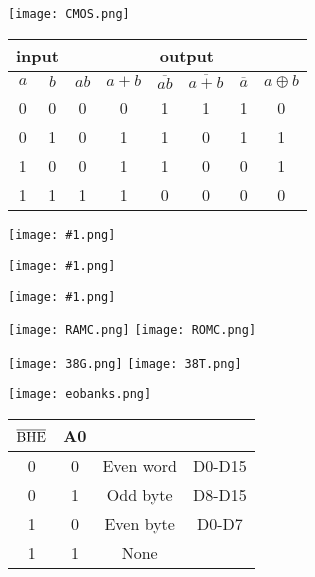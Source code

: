 \documentclass[10pt,a4paper]{article}
\def\img#1#2{\begin{tcolorbox}[title=#2]\texttt{[image: \#1.png]}\end{tcolorbox}}
\begin{document}
\begin{CJK}{UTF8}{song}
\begin{twocolumn}
\begin{tcolorbox}[title=逻辑门电路]
			\centering
			\texttt{[image: CMOS.png]}
			\begin{tabular}{|c|c|c|c|c|c|c|c|}
				\hline
				\multicolumn{2}{|c|}{input} & \multicolumn{6}{c|}{output} \\
				\hline
				$ a $ & $ b $  & $ ab $ & $ a+b $ & $ \overline{ab} $ & $ \overline{a+b} $& $\overline{a}$ & $a\oplus b$ \\
				\hline
				0 & 0 & 0 & 0 & 1 & 1 & 1 & 0 \\
				\hline
				0 & 1 & 0 & 1 & 1 & 0 & 1 & 1 \\
				\hline
				1 & 0 & 0 & 1 & 1 & 0 & 0 & 1 \\
				\hline
				1 & 1 & 1 & 1 & 0 & 0 & 0 & 0 \\
				\hline
			\end{tabular}
		\end{tcolorbox}
		\begin{tcolorbox}[title=锁存器和数据传输器]
			\img{latch}{74LS373 D Latch}
			\img{dt}{Data Bus Transceiver}
		\end{tcolorbox}
		\img{buscycle}{8086/88 总线周期}
		\begin{tcolorbox}[title=RAM\&ROM]
			\centering
				\texttt{[image: RAMC.png]}
				\texttt{[image: ROMC.png]}
		\end{tcolorbox}
		\begin{tcolorbox}[title=74LS138 38译码器]
			\texttt{[image: 38G.png]}
			\texttt{[image: 38T.png]}
		\end{tcolorbox}
		\begin{tcolorbox}[title=8086存储组织]
			\centering
			\texttt{[image: eobanks.png]}
			\begin{tabular}{|c|c|c|c|}
				\hline
				$\rm \overline{BHE}$ & A0 &  &  \\
				\hline
				0 & 0 & Even word & D0-D15 \\
				\hline
				0 & 1 & Odd byte & D8-D15 \\
				\hline
				1 & 0 & Even byte & D0-D7 \\
				\hline
				1 & 1 & None &  \\
				\hline
			\end{tabular}

\end{tcolorbox}
\end{twocolumn}
\end{CJK}
\end{document}
